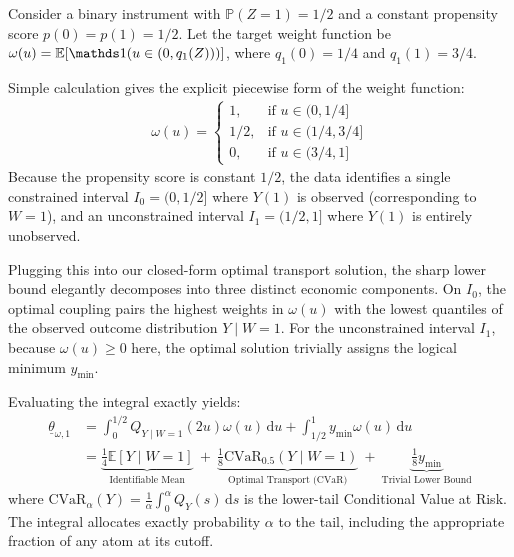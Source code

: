 \begin{example}\label{ex:discrete_bd}
    Consider a binary instrument with $\mathbb{P}(Z=1)=1/2$ and a constant propensity score $p(0) = p(1) = 1/2$. Let the target weight function be $\omega(u) = \mathbb{E}[\indicator(u \in (0, q_1(Z)))]$, where $q_1(0) = 1/4$ and $q_1(1) = 3/4$.

    Simple calculation gives the explicit piecewise form of the weight function:
    \begin{align*}
        \omega(u) =
        \begin{cases}
            1, & \text{if } u \in (0, 1/4] \\
            1/2, & \text{if } u \in (1/4, 3/4] \\
            0, & \text{if } u \in (3/4, 1]
        \end{cases}
    \end{align*}
    Because the propensity score is constant $1/2$, the data identifies a single constrained interval $I_0 = (0, 1/2]$ where $Y(1)$ is observed (corresponding to $W=1$), and an unconstrained interval $I_1 = (1/2, 1]$ where $Y(1)$ is entirely unobserved.

    Plugging this into our closed-form optimal transport solution, the sharp lower bound elegantly decomposes into three distinct economic components. On $I_0$, the optimal coupling pairs the highest weights in $\omega(u)$ with the lowest quantiles of the observed outcome distribution $Y \mid W=1$. For the unconstrained interval $I_1$, because $\omega(u) \geqslant 0$ here, the optimal solution trivially assigns the logical minimum $y_{\min}$.

    Evaluating the integral exactly yields:
    \begin{align}\label{eq:example_bound}
        \underline{\theta}_{\omega, 1}
        &= \int_0^{1/2} Q_{Y \mid W=1}(2u) \omega(u) \, \mathrm{d}u + \int_{1/2}^1 y_{\min} \omega(u) \, \mathrm{d}u \nonumber \\
        &= \underbrace{\frac{1}{4} \mathbb{E}[Y \mid W=1]}_{\text{Identifiable Mean}} \ + \ \underbrace{\frac{1}{8} \text{CVaR}_{0.5}(Y \mid W=1)}_{\text{Optimal Transport (CVaR)}} \ + \ \underbrace{\frac{1}{8} y_{\min}}_{\text{Trivial Lower Bound}}
    \end{align}
    where $\text{CVaR}_{\alpha}(Y) = \frac{1}{\alpha} \int_0^\alpha Q_Y(s) \, \mathrm{d}s$ is the lower-tail Conditional Value at Risk. The integral allocates exactly probability $\alpha$ to the tail, including the appropriate fraction of any atom at its cutoff.


\end{example}
